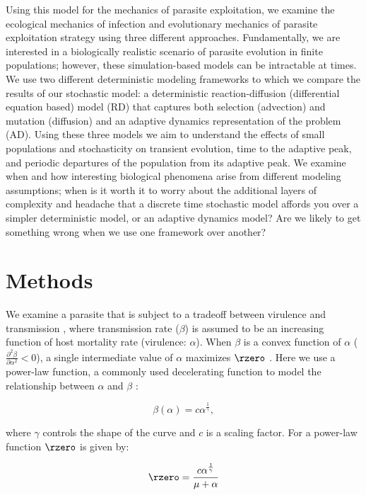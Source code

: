 Using this model for the mechanics of parasite exploitation, we examine the ecological mechanics of infection and evolutionary mechanics of parasite exploitation strategy using three different approaches. Fundamentally, we are interested in a biologically realistic scenario of parasite evolution in finite populations; however, these simulation-based models can be intractable at times. We use two different deterministic modeling frameworks to which we compare the results of our stochastic model: a deterministic reaction-diffusion (differential equation based) model (RD) that captures both selection (advection) and mutation (diffusion) and an adaptive dynamics representation of the problem (AD). Using these three models we aim to understand the effects of small populations and stochasticity on transient evolution, time to the adaptive peak, and periodic departures of the population from its adaptive peak. We examine when and how interesting biological phenomena arise from different modeling assumptions; when is it worth it to worry about the additional layers of complexity and headache that a discrete time stochastic model affords you over a simpler deterministic model, or an adaptive dynamics model? Are we likely to get something wrong when we use one framework over another?

\section*{Methods}

We examine a parasite that is subject to a tradeoff between virulence and transmission \citep{Andersonetal.1982, Ewald1983}, where transmission rate ($\beta$) is assumed to be an increasing function of host mortality rate (virulence: $\alpha$). When $\beta$ is a convex function of $\alpha$ ($\frac{\partial^2 \beta}{\partial \alpha^2} < 0$), a single intermediate value of $\alpha$ maximizes $\rzero$ \citep{Alizonetal.2009}. Here we use a power-law function, a commonly used decelerating function to model the relationship between $\alpha$ and $\beta$ \citep{AlizonandvanBaalen2005, Bolkeretal.2010}: 

\begin{equation*}
\beta(\alpha) = c\alpha^{\frac{1}{\gamma}},
\end{equation*}

\noindent where $\gamma$ controls the shape of the curve and $c$ is a scaling factor. For a power-law function $\rzero$ is given by:

\begin{equation*}
\rzero = \frac{c\alpha^{\frac{1}{\gamma}}}{\mu + \alpha}
\end{equation*}

